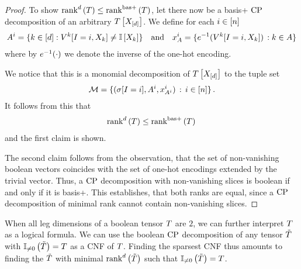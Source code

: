 \begin{proof}
    To show $\mathrm{rank}^{d}\left(T\right) \leq \mathrm{rank}^{\mathrm{bas+}}\left(T\right)$, let there now be a basis+ $\mathrm{CP}$ decomposition of an arbitrary $T\left[X_{[d]}\right]$.
    We define for each $i\in[n]$
    \begin{align*}
        A^{i} = \{k\in[d] : V^{k}[I=i, X_{k}] \neq \mathbb{I}\left[X_{k}\right] \}
        \quad \text{and} \quad
        x_{A}^{i} = \{e^{-1}(V^{k}[I=i, X_{k}] ) \, : k\in A\}
    \end{align*}
    where by $e^{-1}(\cdot)$ we denote the inverse of the one-hot encoding.

    We notice that this is a monomial decomposition of $T\left[X_{[d]}\right]$ to the tuple set
    \begin{align*}
        \mathcal{M} = \{(\sigma[I=i], A^{i}, x_{A^{i}}^{i} ) \, : \, i\in[n] \} \, .
    \end{align*}
    It follows from this that
    \begin{align*}
        \mathrm{rank}^{d}\left(T\right) \leq \mathrm{rank}^{\mathrm{bas+}}\left(T\right) \,
    \end{align*}
    and the first claim is shown.

    The second claim follows from the observation, that the set of non-vanishing boolean vectors coincides with the set of one-hot encodings extended by the trivial vector.
    Thus, a $\mathrm{CP}$ decomposition with non-vanishing slices is boolean if and only if it is basis+.
    This establishes, that both ranks are equal, since a $\mathrm{CP}$ decomposition of minimal rank cannot contain non-vanishing slices.
\end{proof}

\begin{remark}
    When all leg dimensions of a boolean tensor $T$ are $2$, we can further interpret $T$ as a logical formula.
    We can use the boolean $\mathrm{CP}$ decomposition of any tensor $\tilde{T}$ with $\mathbb{I}_{\neq0}\left(\tilde{T}\right)=T$ as a CNF of $T$.
    Finding the sparsest CNF thus amounts to finding the $\tilde{T}$ with minimal $\mathrm{rank}^{d}\left(\tilde{T}\right)$ such that $\mathbb{I}_{\neq0}\left(\tilde{T}\right)=T$.
\end{remark}

